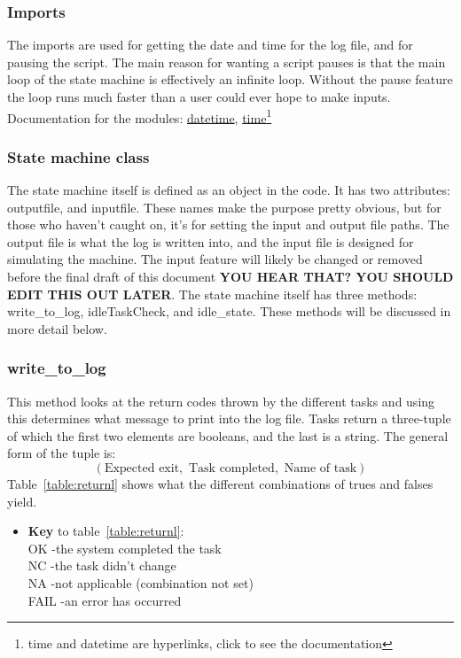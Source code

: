 \documentclass[titlepage]{article}
\begin{document}
\subsubsection{Imports}
\label{section:imports_sm}
The imports are used for getting the date and time for the log file, and for pausing the script. The main reason for wanting a script pauses is that the main loop of the state machine is effectively an infinite loop. Without the pause feature the loop runs much faster than a user could ever hope to make inputs. Documentation for the modules: \href{https://docs.python.org/3/library/datetime.html}{datetime}, 
\href{https://docs.python.org/3/library/time.html}{time}\footnote{time and datetime are hyperlinks, click to see the documentation}\\

\subsubsection{State machine class}
The state machine itself is defined as an object in the code. It has two attributes: outputfile, and inputfile. These names make the purpose pretty obvious, but for those who haven't caught on, it's for setting the input and output file paths. The output file is what the log is written into, and the input file is designed for simulating the machine. The input feature will likely be changed or removed before the final draft of this document \textbf{YOU HEAR THAT? YOU SHOULD EDIT THIS OUT LATER}. The state machine itself has three methods: write\_to\_log, idleTaskCheck, and idle\_state. These methods will be discussed in more detail below.

\subsubsection{write\_to\_log}
\label{section:logwrite}
This method looks at the return codes thrown by the different tasks and using this determines what message to print into the log file. Tasks return a three-tuple of which the first two elements are booleans, and the last is a string. The general form of the tuple is:\\
$$\left(\text{Expected exit}, \text{ Task completed},\text{ Name of task}\right)$$
Table~\ref{table:returnl} shows what the different combinations of trues and falses yield. 

\begin{itemize}
    \item \textbf{Key} to table~\ref{table:returnl}:\\
    OK -the system completed the task\\
    NC -the task didn't change\\
    NA -not applicable (combination not set)\\
    FAIL -an error has occurred\\
\end{itemize}
\end{document}
